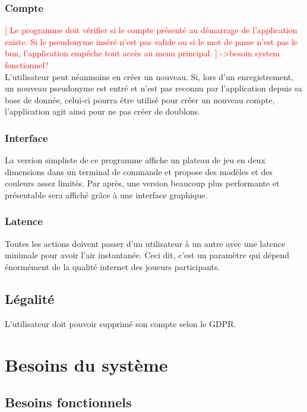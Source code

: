 \documentclass[french, utf8]{article}
\begin{document}
\subsubsection{Compte}
\textcolor{red}{[
Le programme doit vérifier si le compte présenté au démarrage de l'application existe. Si le pseudonyme inséré n'est pas valide ou si le mot de passe n'est pas le bon, l'application empêche tout accès au menu principal. ] \newline
->besoin system fonctionnel?}
\\
L'utilisateur peut néanmoins en créer un nouveau. Si, lors d'un enregistrement, un nouveau pseudonyme est entré et n'est pas reconnu par l'application depuis sa base de donnée, celui-ci pourra être utilisé pour créer un nouveau compte, l'application agit ainsi pour ne pas créer de doublons.
\newline
\subsubsection{Interface}
La version simpliste de ce programme affiche un plateau de jeu en deux dimensions dans un terminal de commande et propose des modèles et des couleurs assez limités. \newline
Par après, une version beaucoup plus performante et présentable sera affiché grâce à une interface graphique.
\subsubsection{Latence}
Toutes les actions doivent passer d’un utilisateur à un autre avec une latence minimale pour avoir l’air instantanée. Ceci dit, c'est un paramètre qui dépend énormément de la qualité internet des joueurs participants.   %
\subsection{Légalité}
L'utilisateur doit pouvoir supprimé son compte selon le GDPR.


\section{Besoins du système}

\subsection{Besoins fonctionnels}
\\
\\
\\
\\
\\
\\
\\
\\
\end{document}
